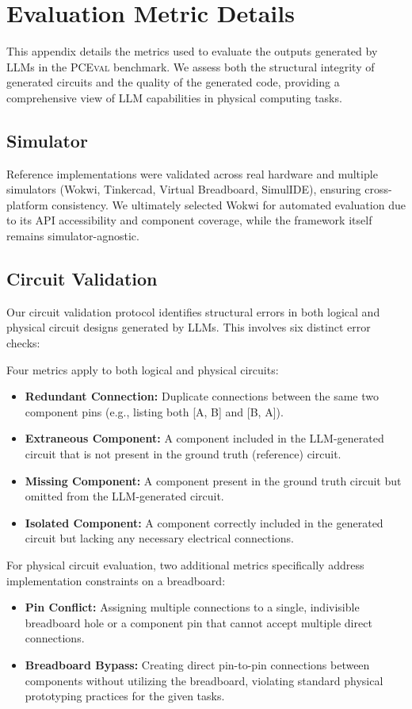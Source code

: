 \documentclass{article} %
\begin{document}
\section{Evaluation Metric Details}
\label{Appendix:eval_validation}

This appendix details the metrics used to evaluate the outputs generated by LLMs in the \textsc{PCEval} benchmark.
We assess both the structural integrity of generated circuits and the quality of the generated code, providing a comprehensive view of LLM capabilities in physical computing tasks.

\subsection{Simulator}
Reference implementations were validated across real hardware and multiple simulators (Wokwi, Tinkercad, Virtual Breadboard, SimulIDE), ensuring cross-platform consistency. 
We ultimately selected Wokwi for automated evaluation due to its API accessibility and component coverage, while the framework itself remains simulator-agnostic. 

\subsection{Circuit Validation}
Our circuit validation protocol identifies structural errors in both logical and physical circuit designs generated by LLMs. This involves six distinct error checks:

Four metrics apply to both logical and physical circuits:
\begin{itemize}[itemsep=0em, topsep=0.5em, labelsep=0.5em, leftmargin=1em]
\item \textbf{Redundant Connection:} Duplicate connections between the same two component pins (e.g., listing both [A, B] and [B, A]).
\item \textbf{Extraneous Component:} A component included in the LLM-generated circuit that is not present in the ground truth (reference) circuit.
\item \textbf{Missing Component:} A component present in the ground truth circuit but omitted from the LLM-generated circuit.
\item \textbf{Isolated Component:} A component correctly included in the generated circuit but lacking any necessary electrical connections.
\end{itemize}

For physical circuit evaluation, two additional metrics specifically address implementation constraints on a breadboard:
\begin{itemize}[itemsep=0em, topsep=0.5em, labelsep=0.5em, leftmargin=1em]
\item \textbf{Pin Conflict:} Assigning multiple connections to a single, indivisible breadboard hole or a component pin that cannot accept multiple direct connections.
\item \textbf{Breadboard Bypass:} Creating direct pin-to-pin connections between components without utilizing the breadboard, violating standard physical prototyping practices for the given tasks.
\end{itemize}
\end{document}
